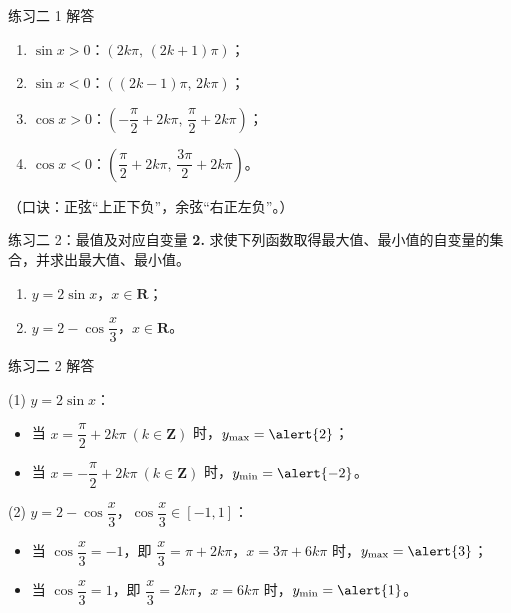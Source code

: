 \documentclass[10pt,aspectratio=169,serif]{beamer}
\begin{document}
\begin{frame}[t]{练习二 1 解答}
\begin{tcolorbox}[colback=orange!10,colframe=orange,title=\textbf{解（$k\in\mathbf Z$）}]
\begin{enumerate}[(1)]
  \item $\sin x>0$：\alert{$(2k\pi,\,(2k+1)\pi)$}；
  \item $\sin x<0$：\alert{$( (2k-1)\pi,\,2k\pi)$}；
  \item $\cos x>0$：\alert{$\left(-\dfrac{\pi}{2}+2k\pi,\,\dfrac{\pi}{2}+2k\pi\right)$}；
  \item $\cos x<0$：\alert{$\left(\dfrac{\pi}{2}+2k\pi,\,\dfrac{3\pi}{2}+2k\pi\right)$}。
\end{enumerate}
\small（口诀：正弦“上正下负”，余弦“右正左负”。）
\end{tcolorbox}
\end{frame}

\begin{frame}[t]{练习二 2：最值及对应自变量}
\textbf{2.} 求使下列函数取得最大值、最小值的自变量的集合，并求出最大值、最小值。
\begin{enumerate}[(1)]
  \item $y=2\sin x$，$x\in\mathbf R$； \qquad
  \item $y=2-\cos\dfrac{x}{3}$，$x\in\mathbf R$。
\end{enumerate}
\end{frame}

\begin{frame}[t]{练习二 2 解答}
\begin{tcolorbox}[colback=orange!10,colframe=orange,title=\textbf{解}]
(1) $y=2\sin x$：
\begin{itemize}
  \item 当 $x=\dfrac{\pi}{2}+2k\pi\ (k\in\mathbf Z)$ 时，$y_{\max}=\alert{2}$；
  \item 当 $x=-\dfrac{\pi}{2}+2k\pi\ (k\in\mathbf Z)$ 时，$y_{\min}=\alert{-2}$。
\end{itemize}
(2) $y=2-\cos\dfrac{x}{3}$，$\cos\dfrac{x}{3}\in[-1,1]$：
\begin{itemize}
  \item 当 $\cos\dfrac{x}{3}=-1$，即 $\dfrac{x}{3}=\pi+2k\pi$，$x=3\pi+6k\pi$ 时，$y_{\max}=\alert{3}$；
  \item 当 $\cos\dfrac{x}{3}=1$，即 $\dfrac{x}{3}=2k\pi$，$x=6k\pi$ 时，$y_{\min}=\alert{1}$。
\end{itemize}
\end{tcolorbox}
\end{frame}
\end{document}
